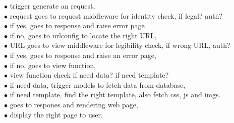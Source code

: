 $\bullet$ trigger generate an request,\\
$\bullet$ request goes to request middleware for identity check, if legal? auth?\\
$\bullet$ if yes, goes to response and raise error page\\
$\bullet$ if no, goes to urlconfig to locate the right URL,\\
$\bullet$ URL goes to view middleware for legibility check, if wrong URL, auth?\\
$\bullet$ if yes, goes to response and raise an error page,\\
$\bullet$ if no, goes to view function, \\
$\bullet$ view function check if need data? if need template?\\
$\bullet$ if need data, trigger models to fetch data from database,\\
$\bullet$ if need template, find the right template, also fetch css, js and imgs.\\
$\bullet$ goes to respones and rendering web page,\\
$\bullet$ display the right page to user.





